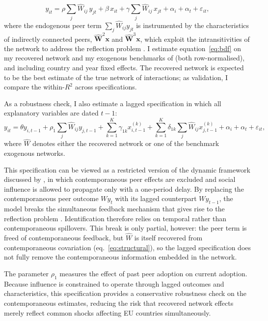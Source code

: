 \documentclass[12pt,a4paper]{article}
\begin{document}
\begin{equation}
    y_{it} = \rho \sum_{j} \hat W_{ij}\, y_{jt} + \beta\, x_{it} + \gamma \sum_{j} \hat W_{ij}\, x_{jt} + \alpha_i + \alpha_t + \varepsilon_{it},
    \label{eq:bdf}
\end{equation}
where the endogenous peer term $\sum_j \hat W_{ij} y_{jt}$ is instrumented by the characteristics of indirectly connected peers, $\mathbf{\hat W}^2\mathbf{x}$ and $\mathbf{\hat W}^3\mathbf{x}$, which exploit the intransitivities of the network to address the reflection problem \citep{manski1993,bramoulle2009}. I estimate equation~\eqref{eq:bdf} on my recovered network and my exogenous benchmarks of \citet{albuquerque2007} (both row-normalised), and including country and year fixed effects. The recovered network is expected to be the best estimate of the true network of interactions; as validation, I compare the within-$R^2$ across specifications.

As a robustness check, I also estimate a lagged specification in which all explanatory variables are dated $t-1$:
\begin{equation}
    y_{it}
    =
    \theta y_{i,t-1}
    +
    \rho_1 \sum_j \hat W_{ij} y_{j,t-1}
    +
    \sum_{k=1}^{K}\gamma_{1k} x_{i,t-1}^{(k)}
    +
    \sum_{k=1}^{K}\delta_{1k}\sum_j \hat W_{ij}x_{j,t-1}^{(k)}
    +
    \alpha_i+\alpha_t+\varepsilon_{it},
    \label{eq:fullag}
\end{equation}
where $\hat W$ denotes either the recovered network or one of the benchmark exogenous networks.

This specification can be viewed as a restricted version of the dynamic framework discussed by \citet{bramoulle2020}, in which contemporaneous peer effects are excluded and social influence is allowed to propagate only with a one-period delay. By replacing the contemporaneous peer outcome $Wy_t$ with its lagged counterpart $Wy_{t-1}$, the model breaks the simultaneous feedback mechanism that gives rise to the reflection problem \citep{manski1993, bramoulle2009}. Identification therefore relies on temporal rather than contemporaneous spillovers. This break is only partial, however: the peer term is freed of contemporaneous feedback, but $\hat W$ is itself recovered from contemporaneous covariation (eq.~\ref{eq:structural}), so the lagged specification does not fully remove the contemporaneous information embedded in the network.

The parameter $\rho_1$ measures the effect of past peer adoption on current adoption. Because influence is constrained to operate through lagged outcomes and characteristics, this specification provides a conservative robustness check on the contemporaneous estimates, reducing the risk that recovered network effects merely reflect common shocks affecting EU countries simultaneously.
\end{document}
